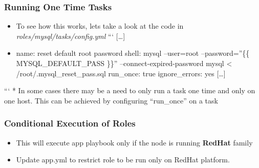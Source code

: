 \subsubsection{Running One Time Tasks}

\begin{itemize}
\item To see how this works, lets take a look at the code in \emph{roles/mysql/tasks/config.yml}\newline
  ```
      [\ldots{}]
\item name: reset default root password
  shell: mysql --user=root --password=''\{\{ MYSQL\_DEFAULT\_PASS \}\}'' --connect-expired-password mysql \textless{} /root/.mysql\_reset\_pass.sql
  run\_once: true
  ignore\_errors: yes
     [\ldots{}]
\end{itemize}

``` \newline
  * In some cases there may be a need to only run a task one time and only on one host. This can be achieved by configuring “run\_once” on a task  

\subsubsection{Conditional Execution of Roles}

\begin{itemize}
\item This will execute app playbook only if the node is running \textbf{RedHat} family  
\item Update app.yml to restrict role to be run only on RedHat platform.
\end{itemize}

